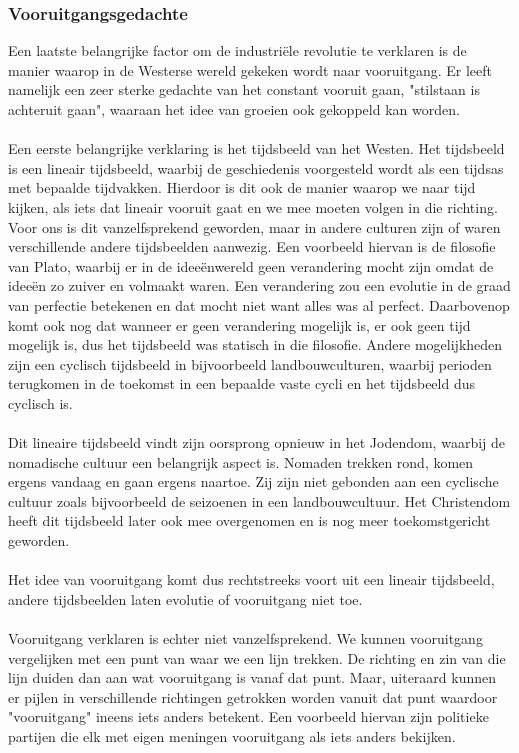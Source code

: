 \documentclass[../summary.tex]{subfiles}
\begin{document}
	\subsubsection{Vooruitgangsgedachte}
	Een laatste belangrijke factor om de industriële revolutie te verklaren is de manier waarop in de Westerse wereld gekeken wordt naar vooruitgang. Er leeft namelijk een zeer sterke gedachte van het constant vooruit gaan, "stilstaan is achteruit gaan", waaraan het idee van groeien ook gekoppeld kan worden.\\
	\\
	Een eerste belangrijke verklaring is het tijdsbeeld van het Westen. Het tijdsbeeld is een lineair tijdsbeeld, waarbij de geschiedenis voorgesteld wordt als een tijdsas met bepaalde tijdvakken. Hierdoor is dit ook de manier waarop we naar tijd kijken, als iets dat lineair vooruit gaat en we mee moeten volgen in die richting. Voor ons is dit vanzelfsprekend geworden, maar in andere culturen zijn of waren verschillende andere tijdsbeelden aanwezig. Een voorbeeld hiervan is de filosofie van Plato, waarbij er in de ideeënwereld geen verandering mocht zijn omdat de ideeën zo zuiver en volmaakt waren. Een verandering zou een evolutie in de graad van perfectie betekenen en dat mocht niet want alles was al perfect. Daarbovenop komt ook nog dat wanneer er geen verandering mogelijk is, er ook geen tijd mogelijk is, dus het tijdsbeeld was statisch in die filosofie. Andere mogelijkheden zijn een cyclisch tijdsbeeld in bijvoorbeeld landbouwculturen, waarbij perioden terugkomen in de toekomst in een bepaalde vaste cycli en het tijdsbeeld dus cyclisch is.\\
	\\
	Dit lineaire tijdsbeeld vindt zijn oorsprong opnieuw in het Jodendom, waarbij de nomadische cultuur een belangrijk aspect is. Nomaden trekken rond, komen ergens vandaag en gaan ergens naartoe. Zij zijn niet gebonden aan een cyclische cultuur zoals bijvoorbeeld de seizoenen in een landbouwcultuur. Het Christendom heeft dit tijdsbeeld later ook mee overgenomen en is nog meer toekomstgericht geworden.\\
	\\
	Het idee van vooruitgang komt dus rechtstreeks voort uit een lineair tijdsbeeld, andere tijdsbeelden laten evolutie of vooruitgang niet toe. \\
	\\
	Vooruitgang verklaren is echter niet vanzelfsprekend. We kunnen vooruitgang vergelijken met een punt van waar we een lijn trekken. De richting en zin van die lijn duiden dan aan wat vooruitgang is vanaf dat punt. Maar, uiteraard kunnen er pijlen in verschillende richtingen getrokken worden vanuit dat punt waardoor "vooruitgang" ineens iets anders betekent. Een voorbeeld hiervan zijn politieke partijen die elk met eigen meningen vooruitgang als iets anders bekijken.\\
\end{document}
